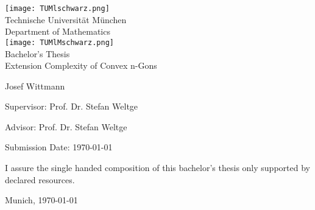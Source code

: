 \begin{titlepage}
  \begin{center}
    \texttt{[image: TUMlschwarz.png]}\\[3mm]
    \sf
    {\Large
      Technische Universität München\\[5mm]
      Department of Mathematics\\[8mm]
    }
    \normalsize
    \texttt{[image: TUMlMschwarz.png]}\\[15mm]

    Bachelor's Thesis\\[15mm]

    {\Huge
    Extension Complexity of Convex n-Gons
    }
    \bigskip

    \normalsize

    Josef Wittmann
  \end{center}
  \vspace*{75mm}

  Supervisor: Prof. Dr. Stefan Weltge
  \medskip

  Advisor: Prof. Dr. Stefan Weltge
  \medskip

  Submission Date: \today

\end{titlepage}

\vspace*{150mm}

I assure the single handed composition of this bachelor's thesis only supported by declared resources.
\bigskip

Munich, \today
\newpage
